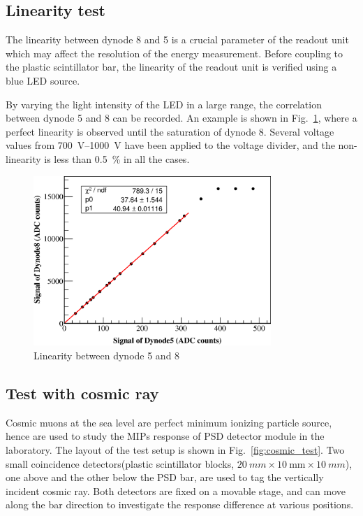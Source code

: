 \documentclass[5p, times]{elsarticle}
\begin{document}
\subsection{Linearity test}
\label{sec:led}
The linearity between dynode 8 and 5 is a crucial parameter of the readout unit which may affect the resolution of the energy measurement.
Before coupling to the plastic scintillator bar, the linearity of the readout unit is verified using a blue LED source.

By varying the light intensity of the LED in a large range, the correlation between dynode 5 and 8 can be recorded.
An example is shown in Fig.~\ref{fig:linearity}, where a perfect linearity is observed until the saturation of dynode 8.
Several voltage values from \SIrange{700}{1000}{\volt} have been applied to the voltage divider, and the non-linearity is less than \SI{0.5}{\percent} in all the cases.

\begin{figure}
\centering
\includegraphics[width=90mm]{linearity}
\caption{Linearity between dynode 5 and 8}
\label{fig:linearity}
\end{figure}

\subsection{Test with cosmic ray}
\label{sec:cosmicray}
Cosmic muons at the sea level are perfect minimum ionizing particle source, hence are used to study the MIPs response of PSD detector module in the laboratory.
The layout of the test setup is shown in Fig.~\ref{fig:cosmic_test}.
Two small coincidence detectors(plastic scintillator blocks, $\SI{20}{mm} \times \SI{10}{\milli\meter} \times \SI{10}{mm}$), one above and the other below the PSD bar, are used to tag the vertically incident cosmic ray.
Both detectors are fixed on a movable stage, and can move along the bar direction to investigate the response difference at various positions. 
\end{document}
